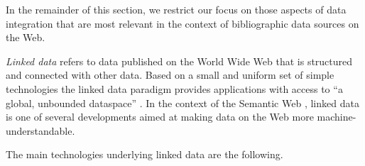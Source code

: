 In the remainder of this section,
we restrict our focus on those aspects of data integration
that are most relevant in the context of bibliographic data sources on the Web.

\emph{Linked data} \autocite{W3CLinkedData,Domingue2011} refers to data published on the World Wide Web that is structured and connected with other data.
Based on a small and uniform set of simple technologies
the linked data paradigm provides applications with access to \enquote{a global, unbounded dataspace} \autocite{Domingue2011}.
In the context of the Semantic Web \autocite{BernersLee2001,Marshall2003},
linked data is one of several developments aimed at making data on the Web more machine-understandable.

The main technologies underlying linked data are the following.
%    
%    
%    

